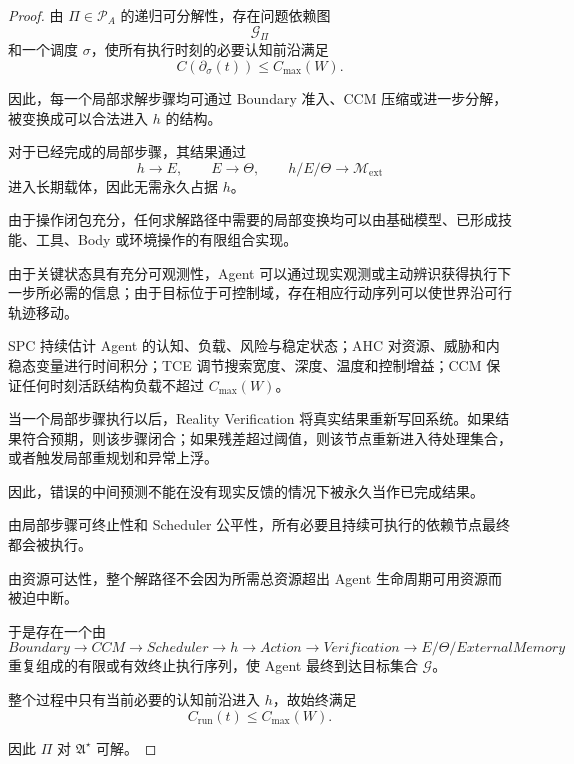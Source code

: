 \begin{proof}
由 $\Pi\in\mathscr P_A$ 的递归可分解性，存在问题依赖图
\begin{equation}
\mathcal G_\Pi
\end{equation}
和一个调度 $\sigma$，使所有执行时刻的必要认知前沿满足
\begin{equation}
C(\partial_\sigma(t))
\leq
C_{\max}(W).
\end{equation}

因此，每一个局部求解步骤均可通过 Boundary 准入、CCM 压缩或进一步分解，被变换成可以合法进入 $h$ 的结构。

对于已经完成的局部步骤，其结果通过
\begin{equation}
h\rightarrow E,
\qquad
E\rightarrow\Theta,
\qquad
h/E/\Theta\rightarrow\mathcal M_{\mathrm{ext}}
\end{equation}
进入长期载体，因此无需永久占据 $h$。

由于操作闭包充分，任何求解路径中需要的局部变换均可以由基础模型、已形成技能、工具、Body 或环境操作的有限组合实现。

由于关键状态具有充分可观测性，Agent 可以通过现实观测或主动辨识获得执行下一步所必需的信息；由于目标位于可控制域，存在相应行动序列可以使世界沿可行轨迹移动。

SPC 持续估计 Agent 的认知、负载、风险与稳定状态；AHC 对资源、威胁和内稳态变量进行时间积分；TCE 调节搜索宽度、深度、温度和控制增益；CCM 保证任何时刻活跃结构负载不超过 $C_{\max}(W)$。

当一个局部步骤执行以后，Reality Verification 将真实结果重新写回系统。如果结果符合预期，则该步骤闭合；如果残差超过阈值，则该节点重新进入待处理集合，或者触发局部重规划和异常上浮。

因此，错误的中间预测不能在没有现实反馈的情况下被永久当作已完成结果。

由局部步骤可终止性和 Scheduler 公平性，所有必要且持续可执行的依赖节点最终都会被执行。

由资源可达性，整个解路径不会因为所需总资源超出 Agent 生命周期可用资源而被迫中断。

于是存在一个由
\begin{equation}
Boundary
\rightarrow
CCM
\rightarrow
Scheduler
\rightarrow
h
\rightarrow
Action
\rightarrow
Verification
\rightarrow
E/\Theta/ExternalMemory
\end{equation}
重复组成的有限或有效终止执行序列，使 Agent 最终到达目标集合 $\mathcal G$。

整个过程中只有当前必要的认知前沿进入 $h$，故始终满足
\begin{equation}
C_{\mathrm{run}}(t)
\leq
C_{\max}(W).
\end{equation}

因此 $\Pi$ 对 $\mathfrak A^\star$ 可解。
\end{proof}

